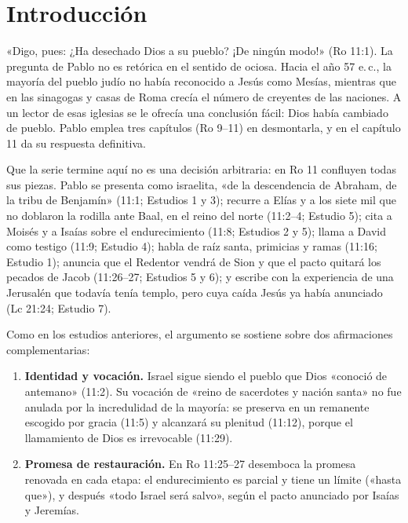 \section{Introducción}

«Digo, pues: ¿Ha desechado Dios a su pueblo? ¡De ningún modo!» (Ro 11:1). La pregunta de Pablo no es retórica en el sentido de ociosa. Hacia el año 57 e.\,c., la mayoría del pueblo judío no había reconocido a Jesús como Mesías, mientras que en las sinagogas y casas de Roma crecía el número de creyentes de las naciones. A un lector de esas iglesias se le ofrecía una conclusión fácil: Dios había cambiado de pueblo. Pablo emplea tres capítulos (Ro 9--11) en desmontarla, y en el capítulo 11 da su respuesta definitiva.

Que la serie termine aquí no es una decisión arbitraria: en Ro 11 confluyen todas sus piezas. Pablo se presenta como israelita, «de la descendencia de Abraham, de la tribu de Benjamín» (11:1; Estudios 1 y 3); recurre a Elías y a los siete mil que no doblaron la rodilla ante Baal, en el reino del norte (11:2--4; Estudio 5); cita a Moisés y a Isaías sobre el endurecimiento (11:8; Estudios 2 y 5); llama a David como testigo (11:9; Estudio 4); habla de raíz santa, primicias y ramas (11:16; Estudio 1); anuncia que el Redentor vendrá de Sion y que el pacto quitará los pecados de Jacob (11:26--27; Estudios 5 y 6); y escribe con la experiencia de una Jerusalén que todavía tenía templo, pero cuya caída Jesús ya había anunciado (Lc 21:24; Estudio 7).

Como en los estudios anteriores, el argumento se sostiene sobre dos afirmaciones complementarias:
\begin{enumerate}
\item \textbf{Identidad y vocación.} Israel sigue siendo el pueblo que Dios «conoció de antemano» (11:2). Su vocación de «reino de sacerdotes y nación santa» no fue anulada por la incredulidad de la mayoría: se preserva en un remanente escogido por gracia (11:5) y alcanzará su plenitud (11:12), porque el llamamiento de Dios es irrevocable (11:29).
\item \textbf{Promesa de restauración.} En Ro 11:25--27 desemboca la promesa renovada en cada etapa: el endurecimiento es parcial y tiene un límite («hasta que»), y después «todo Israel será salvo», según el pacto anunciado por Isaías y Jeremías.
\end{enumerate}

